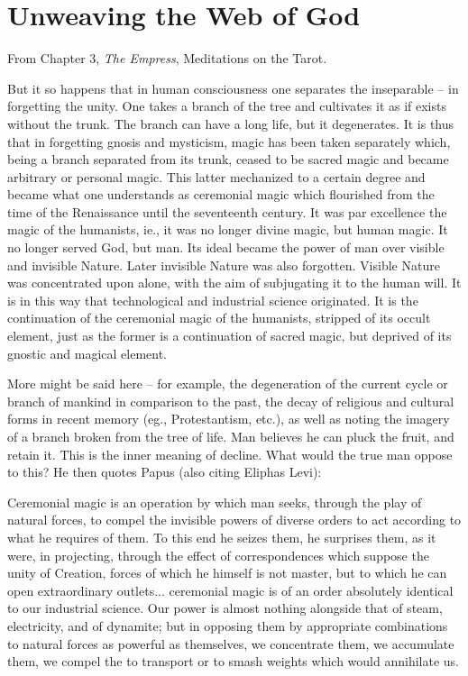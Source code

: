 \section{Unweaving the Web of God}

From Chapter 3, \emph{The Empress}, {Meditations on the Tarot}.

\begin{quotex}
But it so happens that in human consciousness one separates the inseparable -- in forgetting the unity. One takes a branch of the tree and cultivates it as if exists without the trunk. The branch can have a long life, but it degenerates. It is thus that in forgetting gnosis and mysticism, magic has been taken separately which, being a branch separated from its trunk, ceased to be sacred magic and became arbitrary or personal magic. This latter mechanized to a certain degree and became what one understands as ceremonial magic which flourished from the time of the Renaissance until the seventeenth century. It was par excellence the magic of the humanists, ie., it was no longer divine magic, but human magic. It no longer served God, but man. Its ideal became the power of man over visible and invisible Nature. Later invisible Nature was also forgotten. Visible Nature was concentrated upon alone, with the aim of subjugating it to the human will. It is in this way that technological and industrial science originated. It is the continuation of the ceremonial magic of the humanists, stripped of its occult element, just as the former is a continuation of sacred magic, but deprived of its gnostic and magical element.
\end{quotex}


More might be said here -- for example, the degeneration of the current cycle or branch of mankind in comparison to the past, the decay of religious and cultural forms in recent memory (eg., Protestantism, etc.), as well as noting the imagery of a branch broken from the tree of life. Man believes he can pluck the fruit, and retain it. This is the inner meaning of decline. What would the true man oppose to this? He then quotes Papus (also citing Eliphas Levi):

\begin{quotex}
Ceremonial magic is an operation by which man seeks, through the play of natural forces, to compel the invisible powers of diverse orders to act according to what he requires of them. To this end he seizes them, he surprises them, as it were, in projecting, through the effect of correspondences which suppose the unity of Creation, forces of which he himself is not master, but to which he can open extraordinary outlets... ceremonial magic is of an order absolutely identical to our industrial science. Our power is almost nothing alongside that of steam, electricity, and of dynamite; but in opposing them by appropriate combinations to natural forces as powerful as themselves, we concentrate them, we accumulate them, we compel the to transport or to smash weights which would annihilate us. 
\end{quotex}


